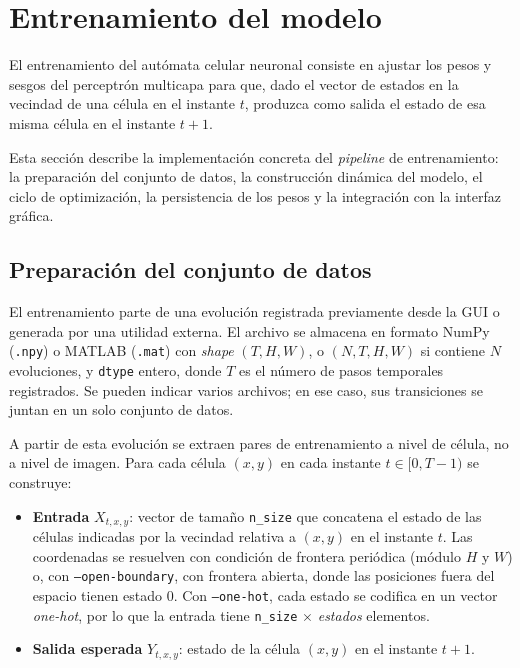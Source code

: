 \section{Entrenamiento del modelo}

El entrenamiento del autómata celular neuronal consiste en ajustar los pesos y sesgos del perceptrón multicapa para que, dado el vector de estados en la vecindad de una célula en el instante $t$, produzca como salida el estado de esa misma célula en el instante $t+1$. 

Esta sección describe la implementación concreta del \textit{pipeline} de entrenamiento: la preparación del conjunto de datos, la construcción dinámica del modelo, el ciclo de optimización, la persistencia de los pesos y la integración con la interfaz gráfica.

\subsection{Preparación del conjunto de datos}

El entrenamiento parte de una evolución registrada previamente desde la GUI o generada por una utilidad externa. El archivo se almacena en formato NumPy (\texttt{.npy}) o MATLAB (\texttt{.mat}) con \textit{shape} $(T, H, W)$, o $(N, T, H, W)$ si contiene $N$ evoluciones, y \texttt{dtype} entero, donde $T$ es el número de pasos temporales registrados. Se pueden indicar varios archivos; en ese caso, sus transiciones se juntan en un solo conjunto de datos.

A partir de esta evolución se extraen pares de entrenamiento a nivel de célula, no a nivel de imagen. Para cada célula $(x, y)$ en cada instante $t \in [0, T-1)$ se construye:

\begin{itemize}
    \item \textbf{Entrada} $X_{t,x,y}$: vector de tamaño \texttt{n\_size} que concatena el estado de las células indicadas por la vecindad relativa a $(x, y)$ en el instante $t$. Las coordenadas se resuelven con condición de frontera periódica (módulo $H$ y $W$) o, con \texttt{--open-boundary}, con frontera abierta, donde las posiciones fuera del espacio tienen estado 0. Con \texttt{--one-hot}, cada estado se codifica en un vector \textit{one-hot}, por lo que la entrada tiene \texttt{n\_size} $\times$ \textit{estados} elementos.
    \item \textbf{Salida esperada} $Y_{t,x,y}$: estado de la célula $(x, y)$ en el instante $t+1$.
\end{itemize}

